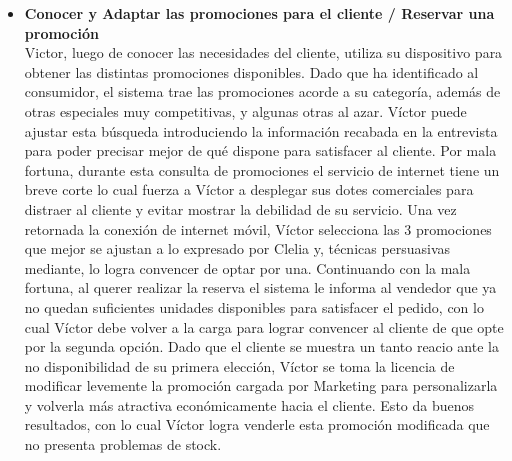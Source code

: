 \begin{itemize}
  \item \textbf{Conocer y Adaptar las promociones para el cliente / Reservar una promoción} \\
    Victor, luego de conocer las necesidades del cliente, utiliza su dispositivo para obtener las distintas promociones disponibles. Dado que ha identificado al consumidor, el sistema trae las promociones acorde a su categoría, además de otras especiales muy competitivas, y algunas otras al azar. Víctor puede ajustar esta búsqueda introduciendo la información recabada en la entrevista para poder precisar mejor de qué dispone para satisfacer al cliente. Por mala fortuna, durante esta consulta de promociones el servicio de internet tiene un breve corte lo cual fuerza a Víctor a desplegar sus dotes comerciales para distraer al cliente y evitar mostrar la debilidad de su servicio. Una vez retornada la conexión de internet móvil, Víctor selecciona las 3 promociones que mejor se ajustan a lo expresado por Clelia y, técnicas persuasivas mediante, lo logra convencer de optar por una. Continuando con la mala fortuna, al querer realizar la reserva el sistema le informa al vendedor que ya no quedan suficientes unidades disponibles para satisfacer el pedido, con lo cual Víctor debe volver a la carga para lograr convencer al cliente de que opte por la segunda opción. Dado que el cliente se muestra un tanto reacio ante la no disponibilidad de su primera elección, Víctor se toma la licencia de modificar levemente la promoción cargada por Marketing para personalizarla y volverla más atractiva económicamente hacia el cliente. Esto da buenos resultados, con lo cual Víctor logra venderle esta promoción modificada que no presenta problemas de stock.\\

\end{itemize}
